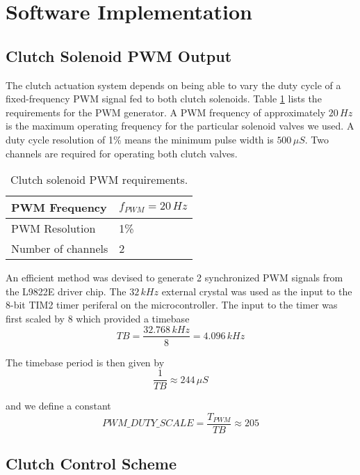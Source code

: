 \documentclass[a4paper,10pt]{scrreprt}
\begin{document}
\section{Software Implementation}

\subsection{Clutch Solenoid PWM Output}

The clutch actuation system depends on being able to vary the duty cycle of a fixed-frequency PWM signal fed to both clutch solenoids. Table \ref{tab:pwm_reqs} lists the requirements for the PWM generator. A PWM frequency of approximately $20\,Hz$ is the maximum operating frequency for the particular solenoid valves we used. A duty cycle resolution of 1\% means the minimum pulse width is $500\,\mu{S}$. Two channels are required for operating both clutch valves.

\begin{table}[ht]
  \caption{Clutch solenoid PWM requirements.}
  \label{tab:pwm_reqs}
  \centering
  \begin{tabular}{|l|l|}
    \hline
    PWM Frequency & $f_{PWM}=20\,Hz$\\
    \hline
    PWM Resolution & 1\% \\
    \hline
    Number of channels & 2 \\
    \hline
  \end{tabular}
\end{table}

An efficient method was devised to generate 2 synchronized PWM signals from the L9822E driver chip. The $32\,kHz$ external crystal was used as the input to the 8-bit TIM2 timer periferal on the microcontroller. The input to the timer was first scaled by 8 which provided a timebase \begin{equation}
  TB=\frac{32.768\,kHz}{8}=4.096\,kHz
\end{equation}

The timebase period is then given by
\begin{equation}
  \frac{1}{TB}\approx 244\,\mu{S}
\end{equation}

and we define a constant
\begin{equation}
  {PWM\_DUTY\_SCALE}=\frac{T_{PWM}}{TB} \approx 205
\end{equation}



\subsection{Clutch Control Scheme}
\end{document}

